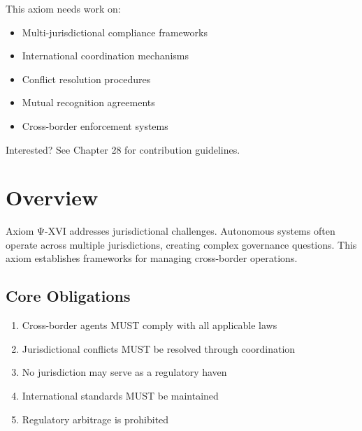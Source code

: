 \begin{tcolorbox}[colback=lightgray, colframe=accentgold, title=\textbf{🎯 Contribution Opportunity}]
This axiom needs work on:
\begin{itemize}
    \item Multi-jurisdictional compliance frameworks
    \item International coordination mechanisms
    \item Conflict resolution procedures
    \item Mutual recognition agreements
    \item Cross-border enforcement systems
\end{itemize}

Interested? See Chapter 28 for contribution guidelines.
\end{tcolorbox}

\vspace{0.5cm}

\section{Overview}

Axiom Ψ-XVI addresses jurisdictional challenges. Autonomous systems often operate across multiple jurisdictions, creating complex governance questions. This axiom establishes frameworks for managing cross-border operations.

\subsection{Core Obligations}

\begin{enumerate}
    \item Cross-border agents MUST comply with all applicable laws
    \item Jurisdictional conflicts MUST be resolved through coordination
    \item No jurisdiction may serve as a regulatory haven
    \item International standards MUST be maintained
    \item Regulatory arbitrage is prohibited
\end{enumerate}

\vspace{0.5cm}

